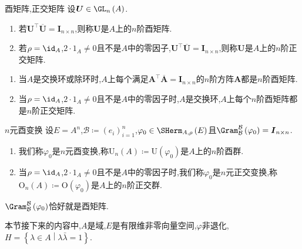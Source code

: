 \begin{definition}{酉矩阵,正交矩阵}{}
	设$\boldsymbol{U}\in\GL_{n}\left(A\right)$.
	\begin{enumerate}
		\item 若$\boldsymbol{U}^{\top}\overline{\boldsymbol{U}}=\boldsymbol{I}_{n\times n}$,则称$\boldsymbol{U}$是$A$上的$n$阶酉矩阵.
		\item 若$\rho=\id_{A}$,$2\cdot 1_{A}\neq 0$且不是$A$中的零因子,$\boldsymbol{U}^{\top}\overline{\boldsymbol{U}}=\boldsymbol{I}_{n\times n}$,则称$\boldsymbol{U}$是$A$上的$n$阶正交矩阵.
	\end{enumerate}
\end{definition}

\begin{remark}{}{}
	\begin{enumerate}
		\item 当$A$是交换环或除环时,$A$上每个满足$\boldsymbol{A}^{\top}\overline{\boldsymbol{A}}=\boldsymbol{I}_{n\times n}$的$n$阶方阵$\boldsymbol{A}$都是$n$阶酉矩阵.
		\item 当$\rho=\id_{A}$,$2\cdot 1_{A}\neq 0$且不是$A$中的零因子时,$A$是交换环,$A$上每个$n$阶酉矩阵都是$n$阶正交矩阵.
	\end{enumerate}
\end{remark}

\begin{definition}{$n$元酉变换}{}
	设$E=A^{n}$,$\mathcal{B}\coloneq\left(e_{i}\right)_{i=1}^{n}$,$\varphi_{0}\in\SHerm_{A,\rho}\left(E\right)$且$\Gram_{\mathcal{B}}^{\mathcal{B}}\left(\varphi_{0}\right)=\boldsymbol{I}_{n\times n}$.
	\begin{enumerate}
		\item 我们称$\varphi_{0}$是$n$元酉变换,称$\mathrm{U}_{n}\left(A\right)\coloneq\mathrm{U}\left(\varphi_{0}\right)$是$A$上的$n$阶酉群.
		\item 当$\rho=\id_{A}$,$2\cdot 1_{A}\neq 0$且不是$A$中的零因子时,我们称$\varphi_{0}$是$n$元正交变换,称$\mathrm{O}_{n}\left(A\right)\coloneq\mathrm{O}\left(\varphi_{0}\right)$是$A$上的$n$阶正交群.
	\end{enumerate}
\end{definition}

\begin{remark}{}{}
	$\Gram_{\mathcal{B}}^{\mathcal{B}}\left(\varphi_{0}\right)$恰好就是酉矩阵.
\end{remark}

本节接下来的内容中,$A$是域,$E$是有限维非零向量空间,$\varphi$非退化,$H=\left\{\lambda\in A\middle|\lambda\bar{\lambda}=1\right\}$.

